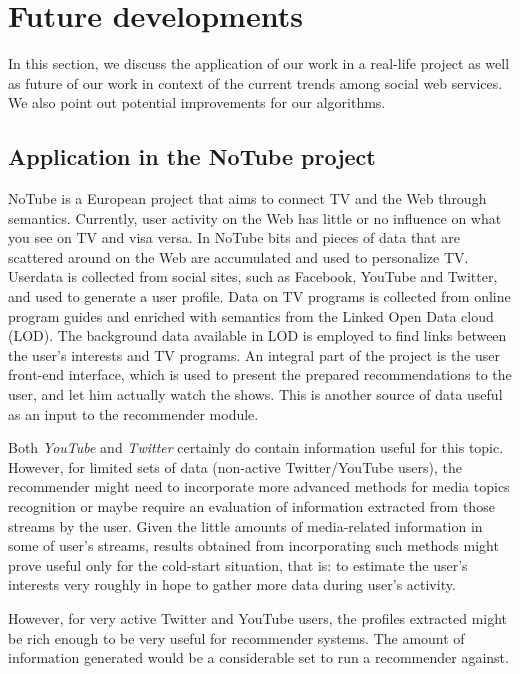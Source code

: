 \section{Future developments}
\label{sec:future}

In this section, we discuss the application of our work in a real-life project
as well as future of our work in context of the current
trends among social web services. We also point out potential improvements for
our algorithms.

\subsection{Application in the NoTube project}

NoTube is a European project that aims to connect TV and the Web through
semantics. Currently, user activity on the Web has little or no influence on
what you see on TV and visa versa. In NoTube bits and pieces of data that are
scattered around on the Web are accumulated and used to personalize TV. Userdata
is collected from social sites, such as Facebook, YouTube and Twitter, and used
to generate a user profile. Data on TV programs is collected from online program
guides and enriched with semantics from the Linked Open Data cloud (LOD). The
background data available in LOD is employed to find links between the user's
interests and TV programs. An integral part of the project is the user front-end
interface, which is used to present the prepared recommendations to the user,
and let him actually watch the shows. This is another source of data useful as
an input to the recommender module.

Both \textit{YouTube} and \textit{Twitter} certainly do contain information
useful for this topic. However, for limited sets of data (non-active
Twitter/YouTube users), the recommender might need to incorporate more advanced methods
for media topics recognition or maybe require an evaluation of information extracted
from those streams by the user. Given the little amounts of media-related information
in some of user's streams, results obtained from incorporating such methods might
prove useful only for the cold-start situation, that is: to estimate the user's interests
very roughly in hope to gather more data during user's activity.

However, for very active Twitter and YouTube users, the profiles extracted
might be rich enough to be very useful for recommender systems. The amount of
information generated would be a considerable set to run a recommender against.

